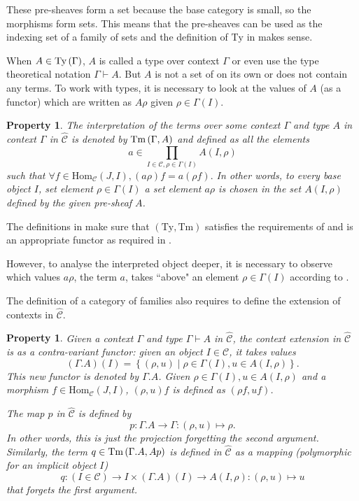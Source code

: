 \documentclass[12pt,a4paper,twoside,xetex]{book} %
\newtheorem{property}[theorem]{Property}
\newcommand{\psh}[1]{\widehat{#1}}
\begin{document}
These pre-sheaves form a set because the base category is small, so the 
morphisms form sets. This means that the pre-sheaves can be used as the indexing 
set of a family of sets and the definition of $\text{Ty}$ in  makes 
sense. 

When $A \in \text{Ty}\left(\Gamma\right)$,  $A$ is called a type over context $\Gamma$ 
or even use the type theoretical notation $\Gamma \vdash A$. But $A$ is not a 
set of on its own or does not contain any terms. To work with types, it is 
necessary to look at the values of $A$ (as a functor) which are written as 
$A\rho$ given $\rho \in \Gamma (I)$.

\begin{property}\label{pretm}
The interpretation of the terms over some context $\Gamma$ and type $A$ in 
context $\Gamma$ in $\psh{\mathcal{C}}$ is denoted by  $\text{Tm}\left(\Gamma,A\right)$ and defined as all the elements $$a 
\in \prod _{I \in \mathcal{C}, \rho \in \Gamma (I)} A(I,\rho)$$ such that 
$\forall f \in \text{Hom}_{\mathcal{C}}(J,I), (a \rho )f = a(\rho f).$ In other 
words, to every base object $I$, set element $\rho \in \Gamma (I)$ a set 
element $a\rho$ is chosen in the set $A(I,\rho)$ defined by the given pre-sheaf 
$A$. 

\end{property}

The definitions in  make sure that $(\text{Ty},\text{Tm})$  
satisfies the requirements of  and is an appropriate functor 
as required in .


However, to analyse the interpreted object deeper, it is necessary to 
observe which values $a\rho$, the term $a$, takes ``above" an element $\rho 
\in \Gamma (I)$ according to .

The definition of a category of families also requires to define the extension 
of contexts in $\psh{\mathcal{C}}$. 

\begin{property}\label{preext}
Given a context $\Gamma$ and type $\Gamma \vdash A$ in $\psh{\mathcal{C}}$, the context extension in $\psh{\mathcal{C}}$ is as a contra-variant functor: given an object $I \in \mathcal{C}$, it takes values $$(\Gamma . A)(I) = \left\{ (\rho , u) \mid \rho \in \Gamma (I) , u \in A (I, \rho ) \right\}.$$ This new functor is 
denoted by $\Gamma . A$. Given $\rho \in \Gamma (I), u \in A(I,\rho )$ and a 
morphism $f \in \text{Hom}_{\mathcal{C}}(J,I)$, $(\rho, u)f$ is defined as 
$(\rho f, uf)$. 


The map $p$ in $\psh{\mathcal{C}}$ is defined by $$p: \Gamma . A \rightarrow 
\Gamma : (\rho , u ) \mapsto \rho.$$ In other words, this is just the 
projection forgetting the second argument. Similarly, the term $q \in 
\text{Tm}\left(\Gamma . A,Ap\right) $ is defined in $\psh{\mathcal{C}}$ as a mapping 
(polymorphic for an implicit object $I$) $$q: (I \in \mathcal{C}) \rightarrow I 
\times (\Gamma . A)(I) \rightarrow A(I,\rho): (\rho, u) \mapsto u$$ that 
forgets the first argument.
\end{property}
\end{document}
